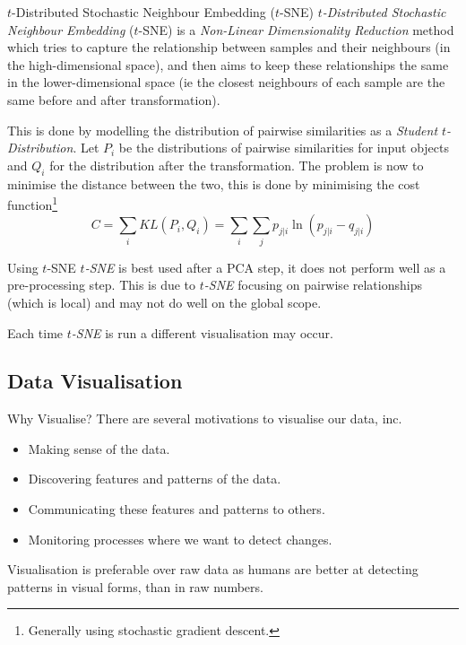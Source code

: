 \documentclass[11pt,a4paper]{article}
\begin{document}
  \begin{definition}{$t$-Distributed Stochastic Neighbour Embedding ($t$-SNE)}
    \textit{$t$-Distributed Stochastic Neighbour Embedding} ($t$-SNE) is a \textit{Non-Linear Dimensionality Reduction} method which tries to capture the relationship between samples and their neighbours (in the high-dimensional space), and then aims to keep these relationships the same in the lower-dimensional space (ie the closest neighbours of each sample are the same before and after transformation).
    \par This is done by modelling the distribution of pairwise similarities as a \textit{Student $t$-Distribution}. Let $P_i$ be the distributions of pairwise similarities for input objects and $Q_i$ for the distribution after the transformation. The problem is now to minimise the distance between the two, this is done by minimising the cost function\footnote{Generally using stochastic gradient descent.}
    \[ C=\sum_iKL(P_i,Q_i)=\sum_i\sum_jp_{j|i}\ln(p_{j|i}-q_{j|i}) \]
  \end{definition}

  \begin{remark}{Using $t$-SNE}
    \textit{$t$-SNE} is best used after a PCA step, it does not perform well as a pre-processing step. This is due to \textit{$t$-SNE} focusing on pairwise relationships (which is local) and may not do well on the global scope.
    \par Each time \textit{$t$-SNE} is run a different visualisation may occur.
  \end{remark}

\subsection{Data Visualisation}

  \begin{remark}{Why Visualise?}
    There are several motivations to visualise our data, inc.
    \begin{itemize}
      \item Making sense of the data.
      \item Discovering features and patterns of the data.
      \item Communicating these features and patterns to others.
      \item Monitoring processes where we want to detect changes.
    \end{itemize}
    Visualisation is preferable over raw data as humans are better at detecting patterns in visual forms, than in raw numbers.
  \end{remark}
\end{document}

